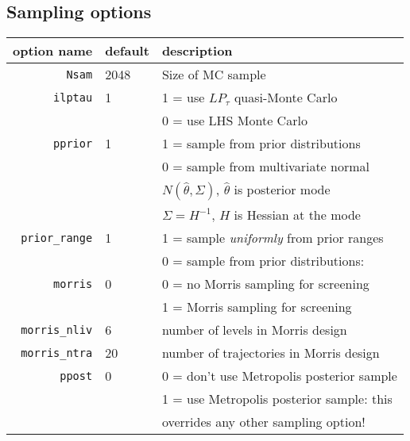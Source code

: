\documentclass[12pt,a4paper]{article}
\begin{document}
\subsection{Sampling options}
\begin{tabular}{r|l|l}
                option name & default & description  \\ \hline
                 \verb"Nsam"& 2048& Size of MC sample \\
               \verb"ilptau"& 1& 1 = use $LP_\tau$ quasi-Monte Carlo \\
                            &  & 0 = use LHS Monte Carlo \\
               \verb"pprior"& 1& 1 = sample from prior distributions\\
                            &  & 0 = sample from multivariate
                            normal \\
                            &  & \hspace{0.5 cm} $N(\hat{\theta},\Sigma)$, $\hat{\theta}$ is posterior mode  \\
                            &  & \hspace{0.5 cm} $\Sigma = H^{-1}$, $H$ is Hessian at the mode\\
          \verb"prior_range"& 1& 1 = sample \textit{uniformly} from prior ranges\\
                            &  & 0 = sample from prior  distributions: \\
               \verb"morris"& 0& 0 = no Morris sampling for screening \\
                            &  & 1 = Morris sampling for screening     \\
          \verb"morris_nliv"& 6& number of levels in Morris design\\
          \verb"morris_ntra"& 20& number of trajectories in Morris design\\
                \verb"ppost"& 0& 0 = don't use Metropolis posterior sample\\
                            &  & 1 = use Metropolis posterior sample: this \\
                            &  & \hspace{0.5 cm} overrides any other sampling option!  \\ \hline
\end{tabular}
\end{document}

